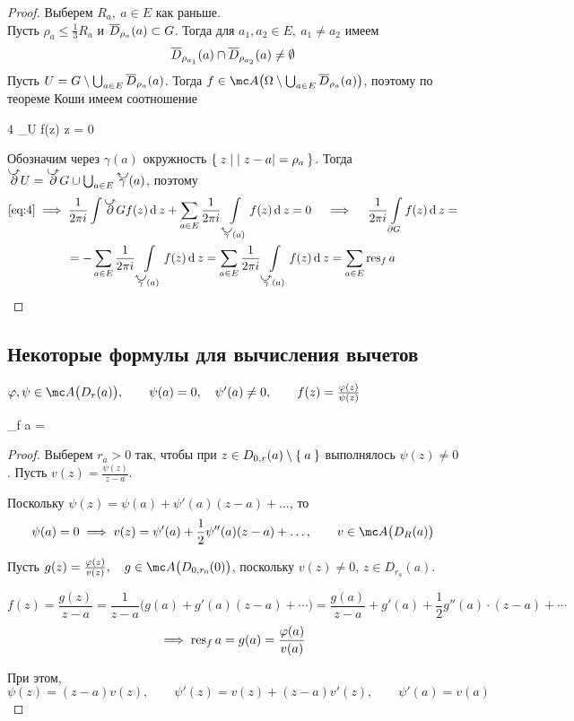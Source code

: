 \begin{proof}
	Выберем $ R_a, ~ a \in E $ как раньше. \\
	Пусть $ \rho_a \le \frac13 R_a $ и $ \overline D_{\rho_a}(a) \subset G $. Тогда для $ a_1, a_2 \in E, ~ a_1 \ne a_2 $ имеем
	$$ \overline D_{\rho_{a_1}}(a) \cap \overline D_{\rho_{a_2}}(a) \ne \emptyset $$
	Пусть $ U = G \setminus \bigcup_{a \in E} \overline D_{\rho_a}(a) $.
	Тогда $ f \in \mc A \big( \Omega \setminus \bigcup_{a \in E} \ol D_{\rho_a}(a) \big) $, поэтому по теореме Коши имеем соотношение
	\begin{equ}4
		 \int\limits_{\partial U} f(z) \di z = 0
	\end{equ}

	Обозначим через $ \gamma(a) $ окружность $ \Set{z \mid |z - a| = \rho_a} $. Тогда $ \curvedir \partial U = \curvedir \partial G \cup \bigcup_{a \in E} \curvedir[0] \gamma(a) $, поэтому
	\begin{multline*}
		\eref4 \implies \frac1{2\pi i} \int\limits{\curvedir\partial G} f(z) \di z + \sum_{a \in E} 	\frac1{2\pi i} \int\limits_{\curvedir[0]\gamma(a)} f(z) \di z = 0 \quad \implies \quad \frac1{2\pi i} \int\limits_{\partial G} f(z) \di z = \\
		= - \sum_{a \in E} \frac1{2\pi i} \int\limits_{\curvedir[0]\gamma(a)} f(z) \di z = \sum_{a \in E} \frac1{2\pi i} \int\limits_{\curvedir \gamma(a)} f(z) \di z = \sum_{a \in E} \res_f a
	\end{multline*}
\end{proof}

\subsection{Некоторые формулы для вычисления вычетов}

\begin{statement}
	$ \phi, \psi \in \mc A \big( D_r(a) \big), \qquad \psi(a) = 0, \quad \psi'(a) \ne 0, \qquad f(z) = \frac{\phi(z)}{\psi(z)} $
	\begin{equ}{5}
		\implies \res_f a = \frac{\phi(a)}{\psi'(a)}
	\end{equ}
\end{statement}

\begin{proof}
	Выберем $ r_a > 0 $ так, чтобы при $ z \in D_{0, r}(a) \setminus \Set{a} $ выполнялось $ \psi(z) \ne 0 $. Пусть $ v(z) = \frac{\psi(z)}{z - a} $.

	Поскольку $ \psi(z) = \psi(a) + \psi'(a) (z - a) + \dots $, то
	$$ \psi(a) = 0 \implies v(z) = \psi'(a) + \frac12 \psi''(a)(z - a) + \dots, \qquad v \in \mc A \big( D_R(a) \big) $$

	Пусть $ g(z) = \frac{\phi(z)}{v(z)}, \quad g \in \mc A \big( D_{0, r_0}(0) \big) $, поскольку $ v(z) \ne 0 $, $ z \in D_{r_a}(a) $.

	$$ f(z) = \frac{g(z)}{z - a} = \frac1{z - a} \big( g(a) + g'(a)(z - a) + \cdots) = \frac{g(a)}{z - a} + g'(a) + \frac12g''(a) \cdot (z - a) + \cdots $$
	$$ \implies \operatorname{res}_f a = g(a) = \frac{\varphi(a)}{v(a)} $$

	При этом,
	$$ \psi(z) = (z - a)v(z), \qquad \psi'(z) = v(z) + (z - a)v'(z), \qquad \psi'(a) = v(a) $$
\end{proof}


